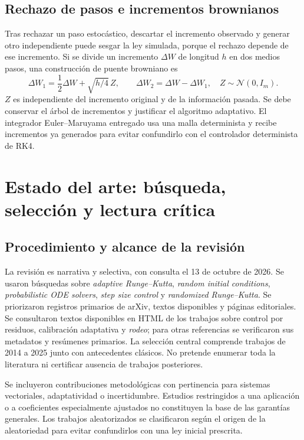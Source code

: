 \documentclass[11pt,a4paper]{article}
\theoremstyle{definition}\newtheorem{definition}[theorem]{Definición}
\theoremstyle{remark}\newtheorem{remark}[theorem]{Observación}
\begin{document}
\subsection{Rechazo de pasos e incrementos brownianos}
Tras rechazar un paso estocástico, descartar el incremento observado y
generar otro independiente puede sesgar la ley simulada, porque el rechazo
depende de ese incremento. Si se divide un incremento $\Delta W$ de longitud
$h$ en dos medios pasos, una construcción de puente browniano es
\[
 \Delta W_1=\frac12\Delta W+\sqrt{h/4}\,Z,\qquad
 \Delta W_2=\Delta W-\Delta W_1,\quad Z\sim\mathcal N(0,I_m).
\]
$Z$ es independiente del incremento original y de la información pasada.
Se debe conservar el árbol de incrementos y justificar el algoritmo
adaptativo. El integrador Euler--Maruyama entregado usa una malla
determinista y recibe incrementos ya generados para evitar confundirlo con
el controlador determinista de RK4.

\clearpage
\section{Estado del arte: búsqueda, selección y lectura crítica}
\subsection{Procedimiento y alcance de la revisión}
La revisión es narrativa y selectiva, con consulta el 13 de octubre de 2026.
Se usaron búsquedas sobre \emph{adaptive Runge--Kutta}, \emph{random initial
conditions}, \emph{probabilistic ODE solvers}, \emph{step size control} y
\emph{randomized Runge--Kutta}. Se priorizaron registros primarios de arXiv,
textos disponibles y páginas editoriales. Se consultaron textos disponibles
en HTML de los trabajos sobre control por residuos, calibración adaptativa
y \emph{rodeo}; para otras referencias se verificaron sus metadatos y
resúmenes primarios. La selección central comprende trabajos de 2014 a
2025 junto con antecedentes clásicos. No pretende enumerar toda la
literatura ni certificar ausencia de trabajos posteriores.

Se incluyeron contribuciones metodológicas con pertinencia para sistemas
vectoriales, adaptatividad o incertidumbre. Estudios restringidos a una
aplicación o a coeficientes especialmente ajustados no constituyen la base
de las garantías generales. Los trabajos aleatorizados se clasificaron
según el origen de la aleatoriedad para evitar confundirlos con una ley
inicial prescrita.
\end{document}
